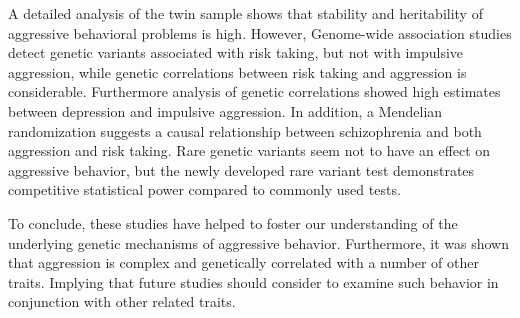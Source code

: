 \documentclass[header.tex]{subfiles}
\begin{document}
A detailed analysis of the twin sample shows that stability and heritability of aggressive behavioral problems is high.
However, Genome-wide association studies detect genetic variants associated with risk taking, but not with impulsive aggression, while genetic correlations between risk taking and aggression is considerable.
Furthermore analysis of genetic correlations showed high estimates between depression and impulsive aggression.
In addition, a Mendelian randomization suggests a causal relationship between schizophrenia and both aggression and risk taking.
Rare genetic variants seem not to have an effect on aggressive behavior, but the newly developed rare variant test demonstrates competitive statistical power compared to commonly used tests.

To conclude, these studies have helped to foster our understanding of the underlying genetic mechanisms of aggressive behavior.
Furthermore, it was shown that aggression is complex and genetically correlated with a number of other traits.
Implying that future studies should consider to examine such behavior in conjunction with other related traits.     
\end{document}
